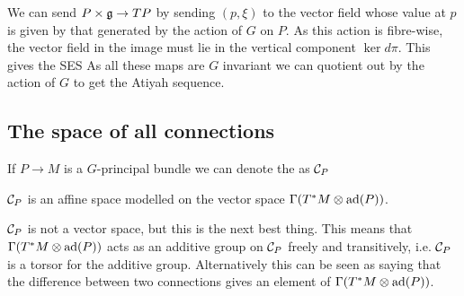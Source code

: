 \documentclass{article}
\begin{document}
\begin{remark}
	We can send $P \times \mathfrak{g} \to TP$ by sending $(p,\xi)$ to the vector field whose value at $p$ is given by that generated by the action of $G$ on $P$. As this action is fibre-wise, the vector field in the image must lie in the vertical component $\ker d\pi$. This gives the SES 
As all these maps are $G$ invariant we can quotient out by the action of $G$ to get the Atiyah sequence. 
\end{remark}

\subsection{The space of all connections}

\begin{definition}
If $P \to M$ is a $G$-principal bundle we can denote the  as $\mathcal{C}_P$
\end{definition} 

\begin{prop}
	$\mathcal{C}_P$ is an affine space modelled on the vector space $\Gamma(T^\ast M \otimes \operatorname{ad}(P))$. 
\end{prop}

\begin{remark}
	$\mathcal{C}_P$ is not a vector space, but this is the next best thing. This means that $\Gamma(T^\ast M \otimes \operatorname{ad}(P))$ acts as an additive group on $\mathcal{C}_P$ freely and transitively, i.e. $\mathcal{C}_P$ is a torsor for the additive group. Alternatively this can be seen as saying that the difference between two connections gives an element of $\Gamma(T^\ast M \otimes \operatorname{ad}(P))$. 
\end{remark}
\end{document}
